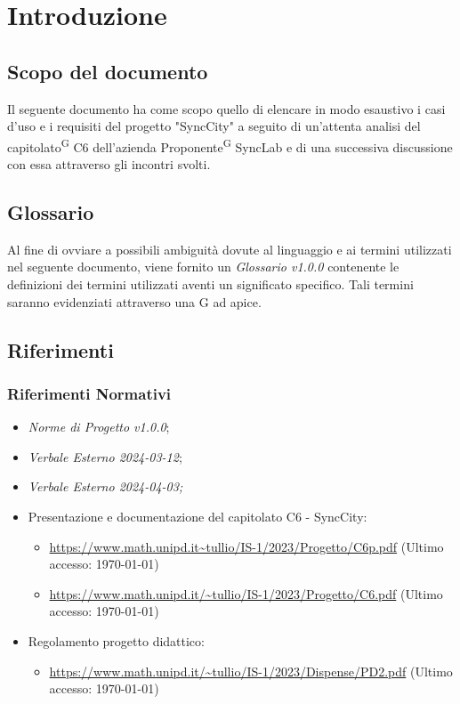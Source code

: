 \documentclass[8pt]{article}
\newcommand{\glossterm}[1]{#1\textsuperscript{G}} %
\begin{document}
\section{Introduzione}
\subsection{Scopo del documento}
Il seguente documento ha come scopo quello di elencare in modo esaustivo i casi d'uso e i requisiti
del progetto "SyncCity" a seguito di un'attenta analisi del \glossterm{capitolato} C6 dell'azienda \glossterm{Proponente} SyncLab e di una successiva discussione con essa attraverso gli incontri svolti.
\subsection{Glossario}
Al fine di ovviare a possibili ambiguità dovute al linguaggio e ai termini utilizzati nel seguente
documento, viene fornito un \textit{Glossario v1.0.0} contenente le definizioni dei termini utilizzati aventi un significato specifico. Tali termini saranno evidenziati attraverso una G ad apice.
\subsection{Riferimenti}
\subsubsection{Riferimenti Normativi}
\begin{itemize}
	\setlength\itemsep{0em}
	\item \textit{Norme di Progetto v1.0.0};	
	\item \textit{Verbale Esterno 2024-03-12};
	\item \textit{Verbale Esterno 2024-04-03;}
  \item Presentazione e documentazione del capitolato C6 - SyncCity:
	\begin{itemize}
		\item \href{https://www.math.unipd.it/~tullio/IS-1/2023/Progetto/C6p.pdf}{https://www.math.unipd.it\textasciitilde{}tullio/IS-1/2023/Progetto/C6p.pdf} (Ultimo accesso: \today)
		\item \href{https://www.math.unipd.it/~tullio/IS-1/2023/Progetto/C6.pdf}{https://www.math.unipd.it/\textasciitilde{}tullio/IS-1/2023/Progetto/C6.pdf} (Ultimo accesso: \today)
\end{itemize}
	\item Regolamento progetto didattico: 
      \begin{itemize}
          \item \href{https://www.math.unipd.it/~tullio/IS-1/2023/Dispense/PD2.pdf}{https://www.math.unipd.it/\textasciitilde{}tullio/IS-1/2023/Dispense/PD2.pdf} (Ultimo accesso: \today)
    \end{itemize}
\end{itemize}
\end{document}
